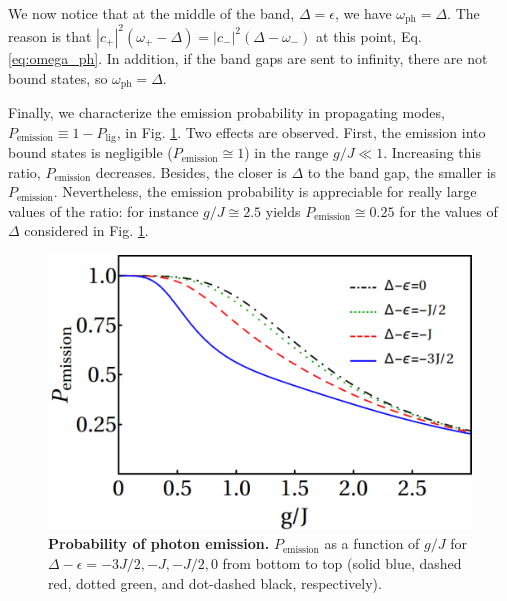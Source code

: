 \documentclass[aps,pra,twocolumn,floatfix,superscriptaddress]{revtex4-1}%
\begin{document}
{\color{blue}We now notice that at the middle of the band, $\Delta=\epsilon$, we have $\omega_\text{ph}=\Delta$. The reason is that $|c_+|^2(\omega_+-\Delta)=|c_-|^2(\Delta-\omega_-)$ at this point, Eq. \eqref{eq:omega_ph}. In addition, if the band gaps are sent to infinity, there are not bound states, so $\omega_\text{ph}=\Delta$.}

Finally, we characterize the emission probability in propagating modes, $P_\text{emission}\equiv 1-P_\text{lig}$, in Fig. \ref{fig:P_emi}. Two effects are observed. First, the emission into bound states is negligible ($P_\text{emission} \cong 1$) in the range $g/J \ll1$. Increasing this ratio, $P_\text{emission}$ decreases. Besides, the closer is $\Delta$ to the band gap, the smaller is $P_\text{emission}$. Nevertheless, the emission probability is appreciable for really large values of the ratio: for instance $g/J \cong 2.5$ yields $P_\text{emission} \cong 0.25$ for the values of $\Delta$ considered in Fig. \ref{fig:P_emi}.

\begin{figure}[thb!]
\includegraphics[width=1.0\columnwidth]{p_emission_a.pdf}
\caption{{\bf Probability of photon emission.} $P_\text{emission}$ as a function of $g/J$ for $\Delta-\epsilon=-3J/2,-J,-J/2,0$ from bottom to top (solid blue, dashed red, dotted green, and dot-dashed black, respectively).}\label{fig:P_emi}
\end{figure}
\end{document}
